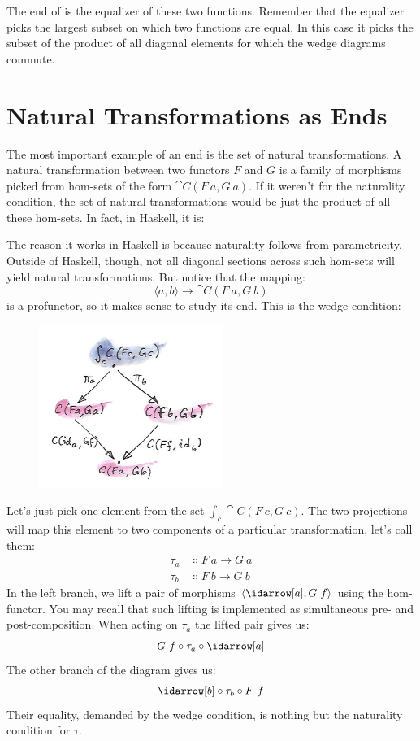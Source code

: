 The end of  is the equalizer of these two functions. Remember
that the equalizer picks the largest subset on which two functions are
equal. In this case it picks the subset of the product of all diagonal
elements for which the wedge diagrams commute.

\section{Natural Transformations as Ends}

The most important example of an end is the set of natural
transformations. A natural transformation between two functors
$F$ and $G$ is a family of morphisms picked from hom-sets
of the form $\cat{C}(F\ a, G\ a)$. If it weren't for the naturality
condition, the set of natural transformations would be just the product
of all these hom-sets. In fact, in Haskell, it is:

The reason it works in Haskell is because naturality follows from
parametricity. Outside of Haskell, though, not all diagonal sections
across such hom-sets will yield natural transformations. But notice that
the mapping:
\[\langle a, b \rangle \to \cat{C}(F\ a, G\ b)\]
is a profunctor, so it makes sense to study its end. This is the wedge
condition:

\begin{figure}[H]
\centering
\includegraphics[width=60mm]{images/end1.jpg}
\end{figure}

\noindent
Let's just pick one element from the set $\int_c \cat{C}(F\ c, G\ c)$.
The two projections will map this element to two components of a
particular transformation, let's call them:
\begin{align*}
\tau_a &\Colon F\ a \to G\ a \\
\tau_b &\Colon F\ b \to G\ b
\end{align*}
In the left branch, we lift a pair of morphisms
$\langle \idarrow[a], G\ f \rangle$ using the hom-functor. You
may recall that such lifting is implemented as simultaneous pre- and
post-composition. When acting on $\tau_a$ the lifted pair gives us:
\[G\ f \circ \tau_a \circ \idarrow[a]\]
The other branch of the diagram gives us:
\[\idarrow[b] \circ \tau_b \circ F\ f\]
Their equality, demanded by the wedge condition, is nothing but the
naturality condition for $\tau$.

